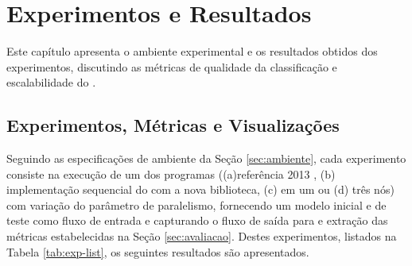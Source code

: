 


% 
% 

\chapter{Experimentos e Resultados}\label{cha:results}

Este capítulo apresenta o ambiente experimental e os resultados obtidos dos
experimentos, discutindo as métricas de qualidade da classificação e
escalabilidade do \mfog.


% 

\section{Experimentos, Métricas e Visualizações}
\label{sec:experiments}

\newcommand{\expA}{\textit{a-Referência}\xspace}
\newcommand{\expB}{\textit{b-Sequencial}\xspace}
\newcommand{\expC}{\textit{c-Paralelo}\xspace}
\newcommand{\expD}{\textit{d-Distribuído}\xspace}

Seguindo as especificações de ambiente da Seção \ref{sec:ambiente}, cada
experimento consiste na execução de um dos programas ((a)\minas referência 2013
\cite{Faria2013source}, (b) implementação sequencial do \minas com a nova
biblioteca, (c) \mfog em um ou (d) três nós) com variação do parâmetro de paralelismo,
fornecendo um modelo inicial e \dataset de teste como fluxo de entrada e
capturando o fluxo de saída para e extração das métricas estabelecidas na Seção
\ref{sec:avaliacao}.
Destes experimentos, listados na Tabela \ref{tab:exp-list}, os seguintes
resultados são apresentados.

